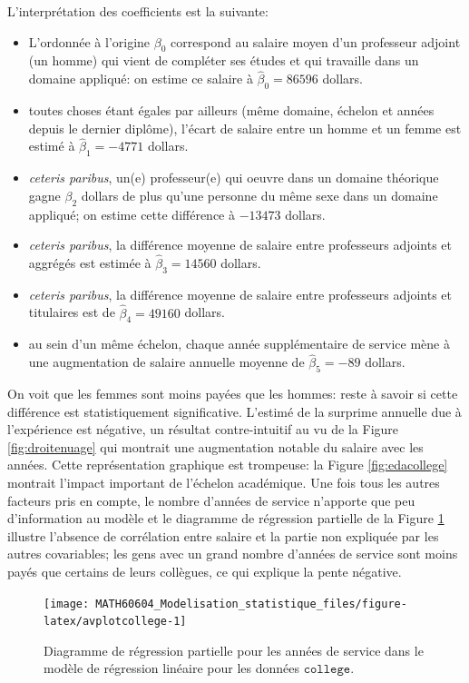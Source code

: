 \documentclass[
  11pt,
  letterpaper,
]{article}
\providecommand{\tightlist}{%
  \setlength{\itemsep}{0pt}\setlength{\parskip}{0pt}}
\theoremstyle{definition}
\theoremstyle{definition}
\theoremstyle{definition}
\theoremstyle{definition}
\theoremstyle{remark}
\begin{document}
L'interprétation des coefficients est la suivante:

\begin{itemize}
\tightlist
\item
  L'ordonnée à l'origine \(\beta_0\) correspond au salaire moyen d'un professeur adjoint (un homme) qui vient de compléter ses études et qui travaille dans un domaine appliqué: on estime ce salaire à \(\widehat{\beta}_0=86596\) dollars.
\item
  toutes choses étant égales par ailleurs (même domaine, échelon et années depuis le dernier diplôme), l'écart de salaire entre un homme et un femme est estimé à \(\widehat{\beta}_1=-4771\) dollars.
\item
  \emph{ceteris paribus}, un(e) professeur(e) qui oeuvre dans un domaine théorique gagne \(\beta_2\) dollars de plus qu'une personne du même sexe dans un domaine appliqué; on estime cette différence à \(-13473\) dollars.
\item
  \emph{ceteris paribus}, la différence moyenne de salaire entre professeurs adjoints et aggrégés est estimée à \(\widehat{\beta}_3=14560\) dollars.
\item
  \emph{ceteris paribus}, la différence moyenne de salaire entre professeurs adjoints et titulaires est de \(\widehat{\beta}_4=49160\) dollars.
\item
  au sein d'un même échelon, chaque année supplémentaire de service mène à une augmentation de salaire annuelle moyenne de \(\widehat{\beta}_5=-89\) dollars.
\end{itemize}

On voit que les femmes sont moins payées que les hommes: reste à savoir si cette différence est statistiquement significative. L'estimé de la surprime annuelle due à l'expérience est négative, un résultat contre-intuitif au vu de la Figure \ref{fig:droitenuage} qui montrait une augmentation notable du salaire avec les années. Cette représentation graphique est trompeuse: la Figure \ref{fig:edacollege} montrait l'impact important de l'échelon académique. Une fois tous les autres facteurs pris en compte, le nombre d'années de service n'apporte que peu d'information au modèle et le diagramme de régression partielle de la Figure \ref{fig:avplotcollege} illustre l'absence de corrélation entre salaire et la partie non expliquée par les autres covariables; les gens avec un grand nombre d'années de service sont moins payés que certains de leurs collègues, ce qui explique la pente négative.

\begin{figure}

{\centering \texttt{[image: MATH60604\_Modelisation\_statistique\_files/figure-latex/avplotcollege-1]} 

}

\caption{Diagramme de régression partielle pour les années de service dans le modèle de régression linéaire pour les données $\texttt{college}$.}\label{fig:avplotcollege}
\end{figure}
\end{document}
